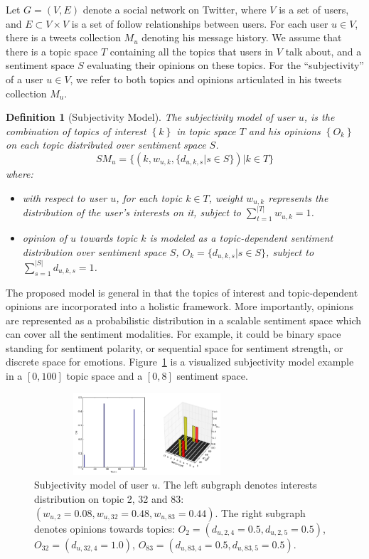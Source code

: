 \documentclass[letterpaper]{article}
\newtheorem{definition}{Definition}
\begin{document}
Let $G=\left( V,E \right) $ denote a social network on Twitter, where $ V $ is a set of users, and $ E\subset V\times V $ is a set of follow relationships between users. For each user $ u \in V $, there is a tweets collection $ M_{u} $ denoting his message history. We assume that there is a topic space $ T $ containing all the topics that users in $ V $ talk about, and a sentiment space $ S $ evaluating their opinions on these topics. 
For the ``subjectivity'' of a user $ u  \in V $, we refer to both topics and opinions articulated in his tweets collection $ M_{u} $.  
\begin{definition}[Subjectivity Model]
The subjectivity model of user $ u $, is the combination of topics of interest $\left\lbrace  k \right\rbrace $ in topic space $T$ and his opinions $\left\lbrace O_{k}\right\rbrace $ on each topic distributed over sentiment space $ S $. 
\begin{equation*}
\label{usermodel}
SM_{u}  = \lbrace \left( k, w_{u,k} , \lbrace d_{u,k,s} |s \in S \rbrace \right) |  k \in T \rbrace
\end{equation*}
where:
\begin{itemize}
\item with respect to user $ u $, for each topic $k \in T$, weight $ w_{u,k} $ represents the distribution of the user's interests on it, subject to $ \sum_{t=1}^{|T|}w_{u,k} =1 $.
\item opinion of $ u $ towards topic $k$ is modeled as a topic-dependent sentiment distribution over sentiment space $ S $, $O_{k}=\lbrace d_{u,k,s}|s \in S \rbrace $, subject to $ \sum_{s=1}^{|S|} d_{u,k,s}=1$.
\end{itemize}
\end{definition}
The proposed model is general in that the topics of interest and topic-dependent opinions are incorporated into a holistic framework. More importantly, opinions are represented as a probabilistic distribution in a scalable sentiment space which can cover all the sentiment modalities. For example, it could be binary space standing for sentiment polarity, or sequential space for sentiment strength, or discrete space for emotions. 
Figure~\ref{fig0} is a visualized subjectivity model example in a $ [0,100] $ topic space and a $ [0,8] $ sentiment space. 
\begin{figure}[t]
\includegraphics[width=3.3in,height=1.2in]{fig1.pdf}
\caption{Subjectivity model of user $u$. The left subgraph denotes interests distribution on topic 2, 32 and 83: $ (  w_{u,2}=0.08,w_{u,32}=0.48, w_{u,83}=0.44)  $. The right subgraph denotes opinions towards topics: $ O_{2}=( d_{u,2,4} =0.5, d_{u,2,5} =0.5)$, $O_{32}=(d_{u,32,4}=1.0) $, $ O_{83}=( d_{u,83,4}=0.5, d_{u,83,5}=0.5 ) $.}
\label{fig0}
\end{figure}
\end{document}
